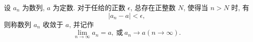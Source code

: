 \begin{definition}{%
    设 $a_n$ 为数列, $a$ 为定数. 对于任给的正数 $\epsilon$, 总存在正整数 $N$, 使得当 $n>N$ 时, 有
    \[
      |a_n - a| < \epsilon,
    \]
    则称数列 ${a_n}$ 收敛于 $a$, 并记作
    \[
      \lim_{n\to\infty} a_n = a, \ \text{或}\  a_n \to a(n\to\infty).
    \]}%
  \end{definition}
  
